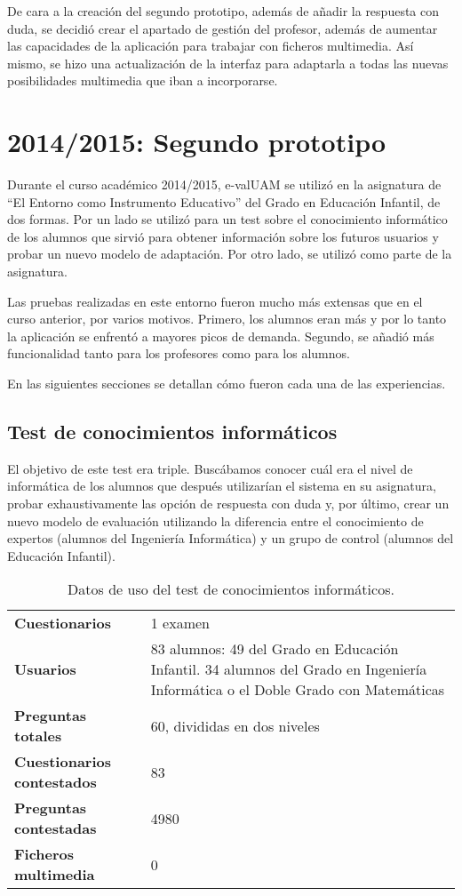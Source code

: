 De cara a la creación del segundo prototipo, además de añadir la respuesta con duda, se decidió crear el apartado de gestión del profesor, además de aumentar las capacidades de la aplicación para trabajar con ficheros multimedia. Así mismo, se hizo una actualización de la interfaz para adaptarla a todas las nuevas posibilidades multimedia que iban a incorporarse.

\section{2014/2015: Segundo prototipo}

Durante el curso académico 2014/2015, \acrshort{e-valUAM} se utilizó en la asignatura de ``El Entorno como Instrumento Educativo'' del Grado en Educación Infantil, de dos formas. Por un lado se utilizó para un test sobre el conocimiento informático de los alumnos que sirvió para obtener información sobre los futuros usuarios y probar un nuevo modelo de adaptación. Por otro lado, se utilizó como parte de la asignatura.

Las pruebas realizadas en este entorno fueron mucho más extensas que en el curso anterior, por varios motivos. Primero, los alumnos eran más y por lo tanto la aplicación se enfrentó a mayores picos de demanda. Segundo, se añadió más funcionalidad tanto para los profesores como para los alumnos.

En las siguientes secciones se detallan cómo fueron cada una de las experiencias.

\subsection{Test de conocimientos informáticos}

El objetivo de este test era triple. Buscábamos conocer cuál era el nivel de informática de los alumnos que después utilizarían el sistema en su asignatura, probar exhaustivamente las opción de respuesta con duda y, por último, crear un nuevo modelo de evaluación utilizando la diferencia entre el conocimiento de expertos (alumnos del Ingeniería Informática) y un grupo de control (alumnos del Educación Infantil).

\begin{table}[hc]
	\centering
	\begin{tabular}{l|p{10cm}}
		{\bf Cuestionarios}             & 1 examen \\ 
		{\bf Usuarios}                  & 83 alumnos: 49 del Grado en Educación Infantil. 34 alumnos del Grado en Ingeniería Informática o el Doble Grado con Matemáticas \\
		{\bf Preguntas totales}         & 60, divididas en dos niveles    \\ 
		{\bf Cuestionarios contestados} & 83                              \\ 
		{\bf Preguntas contestadas}     & 4980                             \\ 
		{\bf Ficheros multimedia}		& 0							   \\
	\end{tabular}
	\caption{Datos de uso del test de conocimientos inform\'aticos.}
\end{table}

